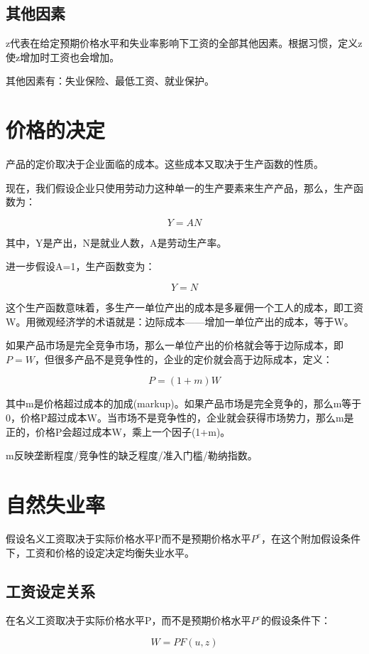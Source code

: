 \documentclass{article}
\begin{document}
\subsection{其他因素}

z代表在给定预期价格水平和失业率影响下工资的全部其他因素。根据习惯，定义z使z增加时工资也会增加。

其他因素有：失业保险、最低工资、就业保护。

\section{价格的决定}

产品的定价取决于企业面临的成本。这些成本又取决于生产函数的性质。

现在，我们假设企业只使用劳动力这种单一的生产要素来生产产品，那么，生产函数为：

\[
Y=AN
\]

其中，Y是产出，N是就业人数，A是劳动生产率。

进一步假设A=1，生产函数变为：

\[
Y=N
\]

这个生产函数意味着，多生产一单位产出的成本是多雇佣一个工人的成本，即工资W。用微观经济学的术语就是：边际成本——增加一单位产出的成本，等于W。

如果产品市场是完全竞争市场，那么一单位产出的价格就会等于边际成本，即$ P=W $，但很多产品不是竞争性的，企业的定价就会高于边际成本，定义：

\[
P=(1+m)W
\]

其中m是价格超过成本的加成(markup)。如果产品市场是完全竞争的，那么m等于0，价格P超过成本W。当市场不是竞争性的，企业就会获得市场势力，那么m是正的，价格P会超过成本W，乘上一个因子(1+m)。

m反映垄断程度/竞争性的缺乏程度/准入门槛/勒纳指数。


\section{自然失业率}

假设名义工资取决于实际价格水平P而不是预期价格水平$ P^e $，在这个附加假设条件下，工资和价格的设定决定均衡失业水平。

\subsection{工资设定关系}

在名义工资取决于实际价格水平P，而不是预期价格水平$ P^e $的假设条件下：

\[
W=PF(u,z)
\]
\end{document}
